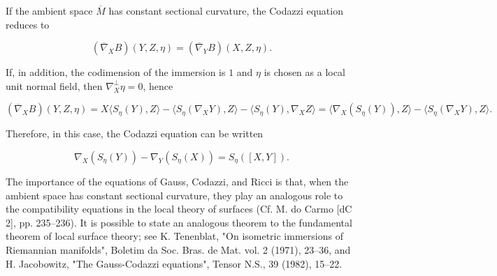 \begin{remark}
  \label{rem:dc-ch6-3-5}
  \leanok
  If the ambient space $\overline{M}$ has constant sectional curvature, the Codazzi
  equation reduces to
  
  $$
  (\overline{\nabla}_X B)(Y,Z,\eta)=(\overline{\nabla}_Y B)(X,Z,\eta).
  $$
  
  If, in addition, the codimension of the immersion is $1$ and $\eta$ is chosen as a
  local unit normal field, then
  $\nabla_X^\perp\eta=0$, hence
  
  $$
  (\overline{\nabla}_X B)(Y,Z,\eta)=X\langle S_\eta(Y),Z\rangle-\langle S_\eta(\nabla_X Y),Z\rangle-\langle S_\eta(Y),\nabla_X Z\rangle=\langle\nabla_X(S_\eta(Y)),Z\rangle-\langle S_\eta(\nabla_X Y),Z\rangle.
  $$
  
  Therefore, in this case, the Codazzi equation can be written
  
  $$
  \nabla_X(S_\eta(Y))-\nabla_Y(S_\eta(X))=S_\eta([X,Y]).
  $$
  
  The importance of the equations of Gauss, Codazzi, and Ricci is that, when the
  ambient space has constant sectional curvature, they play an analogous role to the
  compatibility equations in the local theory of surfaces (Cf. M. do Carmo [dC 2],
  pp. 235–236). It is possible to state an analogous theorem to the fundamental
  theorem of local surface theory; see K. Tenenblat, "On isometric immersions of
  Riemannian manifolds", Boletim da Soc. Bras. de Mat. vol. 2 (1971), 23–36, and
  H. Jacobowitz, "The Gauss-Codazzi equations", Tensor N.S., 39 (1982), 15–22.
\end{remark}
